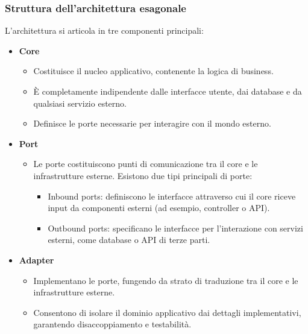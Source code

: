 \subsubsection{Struttura dell'architettura esagonale}
L’architettura si articola in tre componenti principali:
\begin{itemize}
    \item \textbf{Core}
    \begin{itemize}
        \item Costituisce il nucleo applicativo, contenente la logica di business.
        \item È completamente indipendente dalle interfacce utente, dai database e da qualsiasi servizio esterno.
        \item Definisce le porte necessarie per interagire con il mondo esterno.
    \end{itemize}
    \item \textbf{Port}
    \begin{itemize}
        \item Le porte costituiscono punti di comunicazione tra il core e le infrastrutture esterne. Esistono due tipi principali di porte:
        \begin{itemize}
            \item Inbound ports: definiscono le interfacce attraverso cui il core riceve input da componenti esterni (ad esempio, controller o API).
            \item Outbound ports: specificano le interfacce per l'interazione con servizi esterni, come database o API di terze parti.          
        \end{itemize}
    \end{itemize}
    \item \textbf{Adapter}
    \begin{itemize}
        \item Implementano le porte, fungendo da strato di traduzione tra il core e le infrastrutture esterne.
        \item Consentono di isolare il dominio applicativo dai dettagli implementativi, garantendo disaccoppiamento e testabilità.
    \end{itemize}
\end{itemize}


